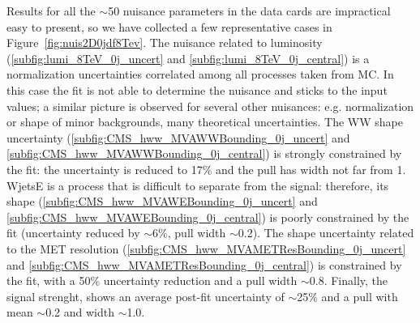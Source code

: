 Results for all the $\sim$50 nuisance parameters in the data cards are impractical easy to present, 
so we have collected a few representative cases in Figure~\ref{fig:nuis2D0jdf8Tev}.
The nuisance related to luminosity (\ref{subfig:lumi_8TeV_0j_uncert} and \ref{subfig:lumi_8TeV_0j_central}) is a normalization uncertainties correlated 
among all processes taken from MC. 
In this case the fit is not able to determine the nuisance and sticks to the input values; a similar picture is observed for several other nuisances: 
e.g. normalization or shape of minor backgrounds, many theoretical uncertainties.
The WW shape uncertainty (\ref{subfig:CMS_hww_MVAWWBounding_0j_uncert} and \ref{subfig:CMS_hww_MVAWWBounding_0j_central}) is strongly constrained by the fit: 
the uncertainty is reduced to 17\% and the pull has width not far from 1.
WjetsE is a process that is difficult to separate from the signal: therefore, its shape (\ref{subfig:CMS_hww_MVAWEBounding_0j_uncert} 
and \ref{subfig:CMS_hww_MVAWEBounding_0j_central}) is poorly constrained by the fit (uncertainty reduced by $\sim$6\%, pull width $\sim$0.2).
The shape uncertainty related to the MET resolution (\ref{subfig:CMS_hww_MVAMETResBounding_0j_uncert} and \ref{subfig:CMS_hww_MVAMETResBounding_0j_central}) is constrained
by the fit, with a 50\% uncertainty reduction and a pull width $\sim$0.8.
Finally, the signal strenght, shows an average post-fit uncertainty of $\sim$25\% and a pull with mean $\sim$0.2 and width $\sim$1.0.

